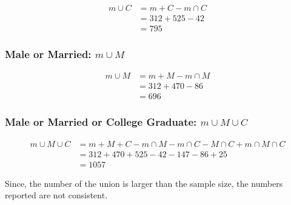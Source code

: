 \documentclass[11pt]{article}
\begin{document}
\begin{align*}
    m \cup C &= m + C - m\cap C\\
    &= 312 + 525 -42\\
    &= 795
\end{align*}

\subsubsection*{Male or Married: $m \cup M$}

\begin{align*}
    m \cup M &= m + M - m\cap M\\
    &= 312 + 470 -86\\
    &= 696
\end{align*}

\subsubsection*{Male or Married or College Graduate: $m\cup M \cup C$}

\begin{align*}
    m\cup M \cup C &= m + M + C - m\cap M - m\cap C - M\cap C + m \cap M \cap C\\
    &= 312 + 470 + 525 - 42 - 147 - 86 +25\\
    &= 1057
\end{align*}

Since, the number of the union is larger than the sample size, the numbers reported are not consistent. 
\end{document}
